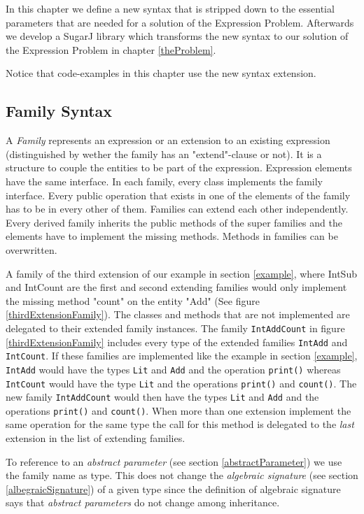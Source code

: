 \documentclass{report}
\begin{document}
In this chapter we define a new syntax that is stripped down to the essential parameters that are needed for a solution of the Expression Problem. Afterwards we develop a SugarJ library which transforms the new syntax to our solution of the Expression Problem in chapter \ref{theProblem}.

Notice that code-examples in this chapter use the new syntax extension.

\subsection{Family Syntax}

A \emph{Family} represents an expression or an extension to an existing expression (distinguished by wether the family has an "extend"-clause or not). It is a structure to couple the entities to be part of the expression. Expression elements have the same interface. In each family, every class implements the family interface. Every public operation that exists in one of the elements of the family has to be in every other of them. Families can extend each other independently. Every derived family inherits the public methods of the super families and the elements have to implement the missing methods. Methods in families can be overwritten.

A family of the third extension of our example in section \ref{example}, where IntSub and IntCount are the first and second extending families would only implement the missing method "count" on the entity "Add" (See figure \ref{thirdExtensionFamily}). The classes and methods that are not implemented are delegated to their extended family instances. The family \lstinline{IntAddCount} in figure \ref{thirdExtensionFamily} includes every type of the extended families \lstinline{IntAdd} and \lstinline{IntCount}. If these families are implemented like the example in section \ref{example}, \lstinline{IntAdd} would have the types \lstinline{Lit} and \lstinline{Add} and the operation \lstinline{print()} whereas \lstinline{IntCount} would have the type \lstinline{Lit} and the operations \lstinline{print()} and \lstinline{count()}. The new family \lstinline{IntAddCount} would then have the types \lstinline{Lit} and \lstinline{Add} and the operations \lstinline{print()} and \lstinline{count()}. When more than one extension implement the same operation for the same type the call for this method is delegated to the \emph{last} extension in the list of extending families.

\label{familyDependentType}
To reference to an \emph{abstract parameter} (see section \ref{abstractParameter}) we use the family name as type. This does not change the \emph{algebraic signature} (see section \ref{albegraicSignature}) of a given type since the definition of algebraic signature says that \emph{abstract parameters} do not change among inheritance.
\end{document}
